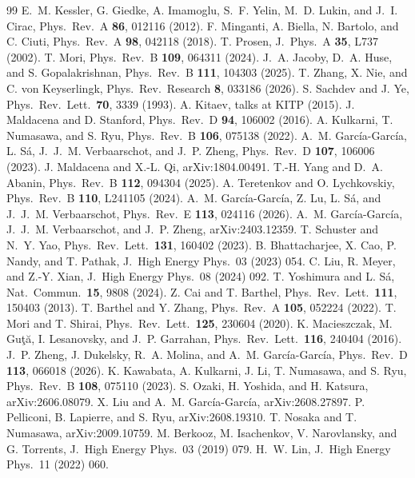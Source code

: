 \documentclass[aps,pre,twocolumn,superscriptaddress,amsmath,amssymb,10pt]{revtex4-2}
\begin{document}
\begin{thebibliography}{99}
 E.~M. Kessler, G. Giedke, A. Imamoglu, S.~F. Yelin, M.~D. Lukin, and J.~I. Cirac, Phys.\ Rev.\ A \textbf{86}, 012116 (2012).
 F. Minganti, A. Biella, N. Bartolo, and C. Ciuti, Phys.\ Rev.\ A \textbf{98}, 042118 (2018).
 T. Prosen, J.\ Phys.\ A \textbf{35}, L737 (2002).
 T. Mori, Phys.\ Rev.\ B \textbf{109}, 064311 (2024).
 J.~A. Jacoby, D.~A. Huse, and S. Gopalakrishnan, Phys.\ Rev.\ B \textbf{111}, 104303 (2025).
 T. Zhang, X. Nie, and C. von Keyserlingk, Phys.\ Rev.\ Research \textbf{8}, 033186 (2026).
 S. Sachdev and J. Ye, Phys.\ Rev.\ Lett.\ \textbf{70}, 3339 (1993).
 A. Kitaev, talks at KITP (2015).
 J. Maldacena and D. Stanford, Phys.\ Rev.\ D \textbf{94}, 106002 (2016).
 A. Kulkarni, T. Numasawa, and S. Ryu, Phys.\ Rev.\ B \textbf{106}, 075138 (2022).
 A.~M. Garc\'ia-Garc\'ia, L. S\'a, J.~J.~M. Verbaarschot, and J.~P. Zheng, Phys.\ Rev.\ D \textbf{107}, 106006 (2023).
 J. Maldacena and X.-L. Qi, arXiv:1804.00491.
 T.-H. Yang and D.~A. Abanin, Phys.\ Rev.\ B \textbf{112}, 094304 (2025).
 A. Teretenkov and O. Lychkovskiy, Phys.\ Rev.\ B \textbf{110}, L241105 (2024).
 A.~M. Garc\'ia-Garc\'ia, Z. Lu, L. S\'a, and J.~J.~M. Verbaarschot, Phys.\ Rev.\ E \textbf{113}, 024116 (2026).
 A.~M. Garc\'ia-Garc\'ia, J.~J.~M. Verbaarschot, and J.~P. Zheng, arXiv:2403.12359.
 T. Schuster and N.~Y. Yao, Phys.\ Rev.\ Lett.\ \textbf{131}, 160402 (2023).
 B. Bhattacharjee, X. Cao, P. Nandy, and T. Pathak, J.\ High Energy Phys.\ 03 (2023) 054.
 C. Liu, R. Meyer, and Z.-Y. Xian, J.\ High Energy Phys.\ 08 (2024) 092.
 T. Yoshimura and L. S\'a, Nat.\ Commun.\ \textbf{15}, 9808 (2024).
 Z. Cai and T. Barthel, Phys.\ Rev.\ Lett.\ \textbf{111}, 150403 (2013).
 T. Barthel and Y. Zhang, Phys.\ Rev.\ A \textbf{105}, 052224 (2022).
 T. Mori and T. Shirai, Phys.\ Rev.\ Lett.\ \textbf{125}, 230604 (2020).
 K. Macieszczak, M. Gu\c{t}\u{a}, I. Lesanovsky, and J.~P. Garrahan, Phys.\ Rev.\ Lett.\ \textbf{116}, 240404 (2016).
 J.~P. Zheng, J. Dukelsky, R.~A. Molina, and A.~M. Garc\'ia-Garc\'ia, Phys.\ Rev.\ D \textbf{113}, 066018 (2026).
 K. Kawabata, A. Kulkarni, J. Li, T. Numasawa, and S. Ryu, Phys.\ Rev.\ B \textbf{108}, 075110 (2023).
 S. Ozaki, H. Yoshida, and H. Katsura, arXiv:2606.08079.
 X. Liu and A.~M. Garc\'ia-Garc\'ia, arXiv:2608.27897.
 P. Pelliconi, B. Lapierre, and S. Ryu, arXiv:2608.19310.
 T. Nosaka and T. Numasawa, arXiv:2009.10759.
 M. Berkooz, M. Isachenkov, V. Narovlansky, and G. Torrents, J.\ High Energy Phys.\ 03 (2019) 079.
 H.~W. Lin, J.\ High Energy Phys.\ 11 (2022) 060.
\end{thebibliography}
\end{document}
